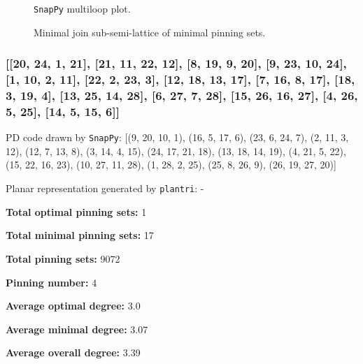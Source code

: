\documentclass{article}%
\begin{document}
\begin{multicols}{2}
\begin{figure}[H]
\centering

\caption{\texttt{SnapPy} multiloop plot.}
\label{fig:tex/img/[[16, 24, 1, 17], [17, 12, 18, 11], [4, 15, 5, 16], [5, 23, 6, 24], [1, 13, 2, 12], [18, 2, 19, 3], [3, 10, 4, 11], [14, 9, 15, 10], [22, 28, 23, 25], [6, 28, 7, 27], [13, 20, 14, 19], [8, 25, 9, 26],.svg}
\end{figure}
\columnbreak

\begin{figure}[H]
\centering
\scalebox{0.8}{}
\caption{Minimal join sub-semi-lattice of minimal pinning sets.}
\label{fig:tex/img/[[16, 24, 1, 17], [17, 12, 18, 11], [4, 15, 5, 16], [5, 23, 6, 24], [1, 13, 2, 12], [18, 2, 19, 3], [3, 10, 4, 11], [14, 9, 15, 10], [22, 28, 23, 25], [6, 28, 7, 27], [13, 20, 14, 19], [8, 25, 9, 26],.pgf}
\end{figure}
\end{multicols}

\newpage

\subsubsection{[[20, 24, 1, 21], [21, 11, 22, 12], [8, 19, 9, 20], [9, 23, 10, 24], [1, 10, 2, 11], [22, 2, 23, 3], [12, 18, 13, 17], [7, 16, 8, 17], [18, 3, 19, 4], [13, 25, 14, 28], [6, 27, 7, 28], [15, 26, 16, 27], [4, 26, 5, 25], [14, 5, 15, 6]]}

{\small\noindent PD code drawn by \texttt{SnapPy}: [(9, 20, 10, 1), (16, 5, 17, 6), (23, 6, 24, 7), (2, 11, 3, 12), (12, 7, 13, 8), (3, 14, 4, 15), (24, 17, 21, 18), (13, 18, 14, 19), (4, 21, 5, 22), (15, 22, 16, 23), (10, 27, 11, 28), (1, 28, 2, 25), (25, 8, 26, 9), (26, 19, 27, 20)]}

{\small\noindent Planar representation generated by \texttt{plantri}: -}

\begin{multicols}{2}
{\normalsize \noindent\textbf{Total optimal pinning sets:} 1

\noindent\textbf{Total minimal pinning sets:} 17

\noindent\textbf{Total pinning sets:} 9072

\noindent\textbf{Pinning number:} 4

}
\columnbreak

{\normalsize \noindent\textbf{Average optimal degree:} 3.0

\noindent\textbf{Average minimal degree:} 3.07

\noindent\textbf{Average overall degree:} 3.39

}
\end{multicols}
\end{document}
